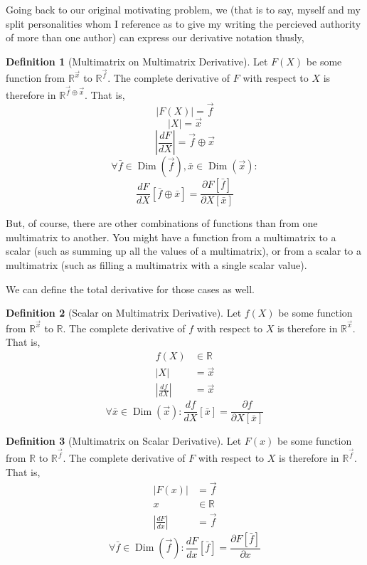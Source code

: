 \documentclass[12pt]{book}
\theoremstyle{plain}
\theoremstyle{definition}
\newtheorem{definition}{Definition}[chapter]
\theoremstyle{ppart}
\theoremstyle{case}
\theoremstyle{solution}
\DeclareMathOperator{\Dim}{Dim}
\newcommand{\shape}[1]{\left|#1\right|}
\begin{document}
Going back to our original motivating problem, we (that is to say, myself and my
split personalities whom I reference as to give my writing the percieved authority
of more than one author) can express our derivative notation thusly,

\begin{definition}[Multimatrix on Multimatrix Derivative]
\label{mm_derivative}
Let $F(X)$ be some function from $\mathbb{R}^{\vec{x}}$ to $\mathbb{R}^{\vec{f}}$.
The complete derivative of $F$ with respect to $X$ is therefore in
$\mathbb{R}^{\vec{f} \oplus \vec{x}}$. That is,
\[ \shape{F(X)} = \vec{f} \]
\[ \shape{X} = \vec{x} \]
\[ \shape{\frac{dF}{dX}} = \vec{f} \oplus \vec{x} \]
\[
\forall \bar{f} \in \Dim(\vec{f}),
        \bar{x} \in \Dim(\vec{x}):
\]
\[
\frac{dF}{dX}[\bar{f} \oplus \bar{x}] =
\frac{\partial F[\bar{f}]}{\partial X[\bar{x}]}
\]
\end{definition}

But, of course, there are other combinations of functions than from one
multimatrix to another. You might have a function from a multimatrix to a
scalar (such as summing up all the values of a multimatrix), or from a scalar
to a multimatrix (such as filling a multimatrix with a single scalar value).

We can define the total derivative for those cases as well.

\begin{definition}[Scalar on Multimatrix Derivative]
\label{sm_derivative}
Let $f(X)$ be some function from $\mathbb{R}^{\vec{x}}$ to $\mathbb{R}$.
The complete derivative of $f$ with respect to $X$ is therefore in
$\mathbb{R}^{\vec{x}}$. That is,
\begin{align*}
f(X) &\in \mathbb{R} \\
\shape{X} &= \vec{x} \\
\shape{\frac{df}{dX}} &= \vec{x}
\end{align*}
\[
\forall \bar{x} \in \Dim(\vec{x}):
        \frac{df}{dX}[\bar{x}] =
        \frac{\partial f}{\partial X[\bar{x}]}
\]
\end{definition}

\begin{definition}[Multimatrix on Scalar Derivative]
\label{ms_derivative}
Let $F(x)$ be some function from $\mathbb{R}$ to $\mathbb{R}^{\vec{f}}$.
The complete derivative of $F$ with respect to $X$ is therefore in
$\mathbb{R}^{\vec{f}}$. That is,
\begin{align*}
\shape{F(x)} &= \vec{f} \\
x &\in \mathbb{R} \\
\shape{\frac{dF}{dx}} &= \vec{f}
\end{align*}
\[
\forall \bar{f} \in \Dim(\vec{f}):
        \frac{dF}{dx}[\bar{f}] =
        \frac{\partial F[\bar{f}]}{\partial x}
\]
\end{definition}
\end{document}
